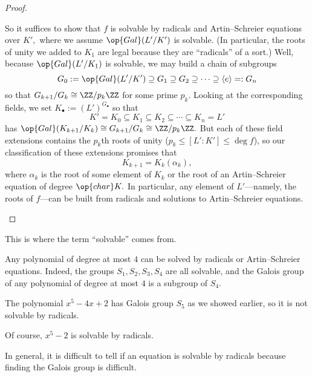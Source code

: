 \documentclass[../notes.tex]{subfiles}
\begin{document}
\begin{proof}
\begin{itemize}
		So it suffices to show that $f$ is solvable by radicals and Artin--Schreier equations over $K',$ where we assume $\op{Gal}(L'/K')$ is solvable. (In particular, the roots of unity we added to $K_1$ are legal because they are ``radicals'' of a sort.) Well, because $\op{Gal}(L'/K_1)$ is solvable, we may build a chain of subgroups
		\[G_0:=\op{Gal}(L'/K')\supseteq G_1\supseteq G_2\supseteq\cdots\supseteq\langle e\rangle=:G_n\]
		so that $G_{k+1}/G_k\cong\ZZ/p_k\ZZ$ for some prime $p_k.$ Looking at the corresponding fields, we set $K_\bullet:=(L')^{G_\bullet}$ so that
		\[K'=K_0\subseteq K_1\subseteq K_2\subseteq\cdots\subseteq K_n=L'\]
		has $\op{Gal}(K_{k+1}/K_k)\cong G_{k+1}/G_k\cong\ZZ/p_k\ZZ.$ But each of these field extensions contains the $p_k$th roots of unity ($p_k\le[L':K']\le\deg f$), so our classification of these extensions promises that
		\[K_{k+1}=K_k(\alpha_k),\]
		where $\alpha_k$ is the root of some element of $K_k$ or the root of an Artin--Schreier equation of degree $\op{char}K.$ In particular, any element of $L'$---namely, the roots of $f$---can be built from radicals and solutions to Artin--Schreier equations.
		\qedhere
	\end{itemize}
\end{proof}
\begin{remark}
	This is where the term ``solvable'' comes from.
\end{remark}
\begin{ex}
	Any polynomial of degree at most $4$ can be solved by radicals or Artin--Schreier equations. Indeed, the groups $S_1,S_2,S_3,S_4$ are all solvable, and the Galois group of any polynomial of degree at most $4$ is a subgroup of $S_4.$
\end{ex}
\begin{example}
	The polynomial $x^5-4x+2$ has Galois group $S_5$ as we showed earlier, so it is not solvable by radicals.
\end{example}
\begin{example}
	Of course, $x^5-2$ is solvable by radicals.
\end{example}
In general, it is difficult to tell if an equation is solvable by radicals because finding the Galois group is difficult.
\end{document}
